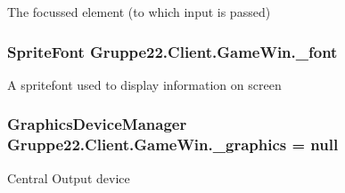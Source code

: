 The focussed element (to which input is passed) 

\hypertarget{class_gruppe22_1_1_client_1_1_game_win_abb8bed1c5a9835889c4cf3cfdcf55565}{
\subsubsection[{\-\_\-font}]{\setlength{\rightskip}{0pt plus 5cm}Sprite\-Font Gruppe22.\-Client.\-Game\-Win.\-\_\-font\hspace{0.3cm}{\ttfamily [protected]}}}\label{class_gruppe22_1_1_client_1_1_game_win_abb8bed1c5a9835889c4cf3cfdcf55565}


A spritefont used to display information on screen 

\hypertarget{class_gruppe22_1_1_client_1_1_game_win_aa40dabf43f3be876e3aec217cf20f4ee}{
\subsubsection[{\-\_\-graphics}]{\setlength{\rightskip}{0pt plus 5cm}Graphics\-Device\-Manager Gruppe22.\-Client.\-Game\-Win.\-\_\-graphics = null\hspace{0.3cm}{\ttfamily [protected]}}}\label{class_gruppe22_1_1_client_1_1_game_win_aa40dabf43f3be876e3aec217cf20f4ee}


Central Output device 

